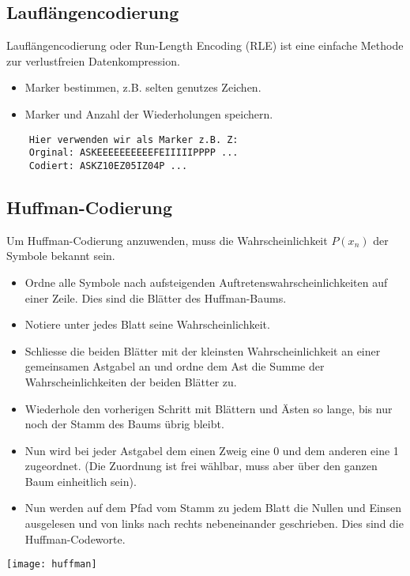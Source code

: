 \subsection{Lauflängencodierung}
Lauflängencodierung oder Run-Length Encoding (RLE) ist eine einfache Methode 
zur verlustfreien Datenkompression.
\begin{itemize}
    \item Marker bestimmen, z.B. selten genutzes Zeichen.
    \item Marker und Anzahl der Wiederholungen speichern.
\end{itemize}
\begin{verbatim}
    Hier verwenden wir als Marker z.B. Z:
    Orginal: ASKEEEEEEEEEEFEIIIIIPPPP ...
    Codiert: ASKZ10EZ05IZ04P ...
\end{verbatim}
\subsection{Huffman-Codierung}
Um Huffman-Codierung anzuwenden, muss die Wahrscheinlichkeit $P(x_n)$ der Symbole bekannt sein.
\begin{itemize}
    \item Ordne alle Symbole nach aufsteigenden Auftretenswahrscheinlichkeiten auf einer Zeile. Dies sind die Blätter des Huffman-Baums.
    \item Notiere unter jedes Blatt seine Wahrscheinlichkeit.
    \item Schliesse die beiden Blätter mit der kleinsten Wahrscheinlichkeit an einer gemeinsamen Astgabel an und ordne dem Ast die Summe der Wahrscheinlichkeiten der beiden Blätter zu.
    \item Wiederhole den vorherigen Schritt mit Blättern und Ästen so lange, bis nur noch der Stamm des Baums übrig bleibt.
    \item Nun wird bei jeder Astgabel dem einen Zweig eine 0 und dem anderen eine 1 zugeordnet. (Die Zuordnung ist frei wählbar, muss aber über den ganzen Baum einheitlich sein).
    \item Nun werden auf dem Pfad vom Stamm zu jedem Blatt die Nullen und Einsen ausgelesen und von links nach rechts nebeneinander geschrieben. Dies sind die Huffman-Codeworte.
\end{itemize}
\texttt{[image: huffman]}
